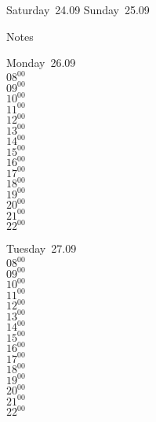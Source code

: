 \documentclass[11pt,a4paper]{book}\usepackage[]{graphicx}\usepackage[]{color}
\begin{document}
\begin{weekendbox}
  Saturday~24.09
  \tcblower
  Sunday~25.09
\end{weekendbox} %
\begin{notebox}
  Notes
\end{notebox}
\clearpage
\begin{headerbox}
\end{headerbox}
\begin{weekdaybox}
  Monday~26.09\\
  { 
  \vfill
  $08^{00}$\\
$09^{00}$\\
$10^{00}$\\
$11^{00}$\\
$12^{00}$\\
$13^{00}$\\
$14^{00}$\\
$15^{00}$\\
$16^{00}$\\
$17^{00}$\\
$18^{00}$\\
$19^{00}$\\
$20^{00}$\\
$21^{00}$\\
$22^{00}$\\
  }
\end{weekdaybox}
\begin{weekdaybox}
  Tuesday~27.09\\
  { 
  \vfill
  $08^{00}$\\
$09^{00}$\\
$10^{00}$\\
$11^{00}$\\
$12^{00}$\\
$13^{00}$\\
$14^{00}$\\
$15^{00}$\\
$16^{00}$\\
$17^{00}$\\
$18^{00}$\\
$19^{00}$\\
$20^{00}$\\
$21^{00}$\\
$22^{00}$\\
  }
\end{weekdaybox}
\end{document}
